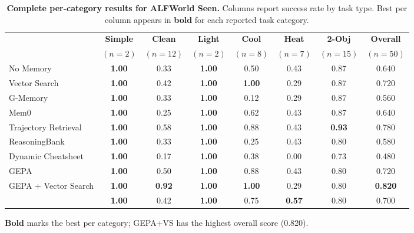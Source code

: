\begin{table}[!htbp]
\centering
\caption{\textbf{Complete per-category results for ALFWorld Seen.}
Columns report success rate by task type.
Best per column appears in \textbf{bold} for each reported task category.}
\label{tab:per-cat-alf-seen}
\small
\setlength{\tabcolsep}{4pt}
\begin{tabular}{@{}l cccccc c@{}}
\toprule
& \textbf{Simple} & \textbf{Clean} & \textbf{Light} & \textbf{Cool} & \textbf{Heat} & \textbf{2-Obj} & \textbf{Overall} \\
& \footnotesize$(n{=}2)$ & \footnotesize$(n{=}12)$ & \footnotesize$(n{=}2)$ & \footnotesize$(n{=}8)$ & \footnotesize$(n{=}7)$ & \footnotesize$(n{=}15)$ & \footnotesize$(n{=}50)$ \\
\midrule
No Memory            & \textbf{1.00} & 0.33 & \textbf{1.00} & 0.50 & 0.43 & 0.87 & 0.640 \\
Vector Search        & \textbf{1.00} & 0.42 & \textbf{1.00} & \textbf{1.00} & 0.29 & 0.87 & 0.720 \\
G-Memory             & \textbf{1.00} & 0.33 & \textbf{1.00} & 0.12 & 0.29 & 0.87 & 0.560 \\
Mem0                 & \textbf{1.00} & 0.25 & \textbf{1.00} & 0.62 & 0.43 & 0.87 & 0.640 \\
Trajectory Retrieval & \textbf{1.00} & 0.58 & \textbf{1.00} & 0.88 & 0.43 & \textbf{0.93} & 0.780 \\
ReasoningBank        & \textbf{1.00} & 0.33 & \textbf{1.00} & 0.25 & 0.43 & 0.80 & 0.580 \\
Dynamic Cheatsheet   & \textbf{1.00} & 0.17 & \textbf{1.00} & 0.38 & 0.00 & 0.73 & 0.480 \\
GEPA                 & \textbf{1.00} & 0.50 & \textbf{1.00} & 0.88 & 0.43 & 0.80 & 0.720 \\
GEPA + Vector Search & \textbf{1.00} & \textbf{0.92} & \textbf{1.00} & \textbf{1.00} & 0.29 & 0.80 & \textbf{0.820} \\
\rowcolor{green!10}
\sysname{}           & \textbf{1.00} & 0.42 & \textbf{1.00} & 0.75 & \textbf{0.57} & 0.80 & 0.700 \\
\bottomrule
\end{tabular}
\vspace{0.3em}

{\footnotesize \textbf{Bold} marks the best per category; GEPA+VS has the highest overall score (0.820).}
\end{table}

